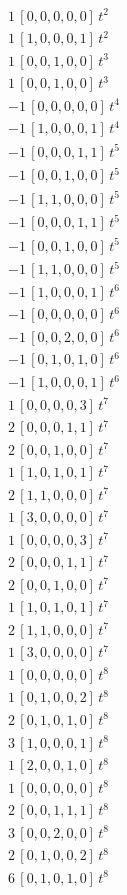 \begin{align*}
1\,[0,0,0,0,0]\,t^{2} \\
1\,[1,0,0,0,1]\,t^{2} \\
1\,[0,0,1,0,0]\,t^{3} \\
1\,[0,0,1,0,0]\,t^{3} \\
-1\,[0,0,0,0,0]\,t^{4} \\
-1\,[1,0,0,0,1]\,t^{4} \\
-1\,[0,0,0,1,1]\,t^{5} \\
-1\,[0,0,1,0,0]\,t^{5} \\
-1\,[1,1,0,0,0]\,t^{5} \\
-1\,[0,0,0,1,1]\,t^{5} \\
-1\,[0,0,1,0,0]\,t^{5} \\
-1\,[1,1,0,0,0]\,t^{5} \\
-1\,[1,0,0,0,1]\,t^{6} \\
-1\,[0,0,0,0,0]\,t^{6} \\
-1\,[0,0,2,0,0]\,t^{6} \\
-1\,[0,1,0,1,0]\,t^{6} \\
-1\,[1,0,0,0,1]\,t^{6} \\
1\,[0,0,0,0,3]\,t^{7} \\
2\,[0,0,0,1,1]\,t^{7} \\
2\,[0,0,1,0,0]\,t^{7} \\
1\,[1,0,1,0,1]\,t^{7} \\
2\,[1,1,0,0,0]\,t^{7} \\
1\,[3,0,0,0,0]\,t^{7} \\
1\,[0,0,0,0,3]\,t^{7} \\
2\,[0,0,0,1,1]\,t^{7} \\
2\,[0,0,1,0,0]\,t^{7} \\
1\,[1,0,1,0,1]\,t^{7} \\
2\,[1,1,0,0,0]\,t^{7} \\
1\,[3,0,0,0,0]\,t^{7} \\
1\,[0,0,0,0,0]\,t^{8} \\
1\,[0,1,0,0,2]\,t^{8} \\
2\,[0,1,0,1,0]\,t^{8} \\
3\,[1,0,0,0,1]\,t^{8} \\
1\,[2,0,0,1,0]\,t^{8} \\
1\,[0,0,0,0,0]\,t^{8} \\
2\,[0,0,1,1,1]\,t^{8} \\
3\,[0,0,2,0,0]\,t^{8} \\
2\,[0,1,0,0,2]\,t^{8} \\
6\,[0,1,0,1,0]\,t^{8} \\

\end{align*}
